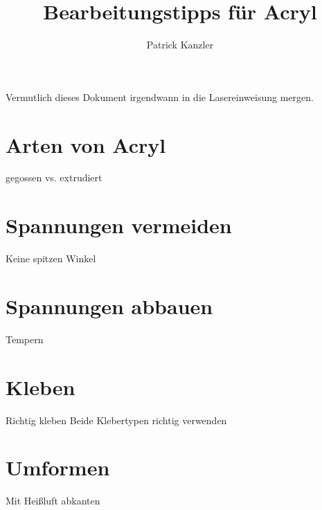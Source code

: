 \documentclass{\basedir/fablab-document}
\title{Bearbeitungstipps für Acryl}
\author{Patrick Kanzler}
\begin{document}
\maketitle
 Vermutlich dieses Dokument irgendwann in die Lasereinweisung mergen. 
 \section{Arten von Acryl}
gegossen vs. extrudiert

\section{Spannungen vermeiden}
Keine spitzen Winkel

\section{Spannungen abbauen}
Tempern

\section{Kleben}
Richtig kleben
Beide Klebertypen richtig verwenden

\section{Umformen}
Mit Heißluft abkanten
\end{document}
